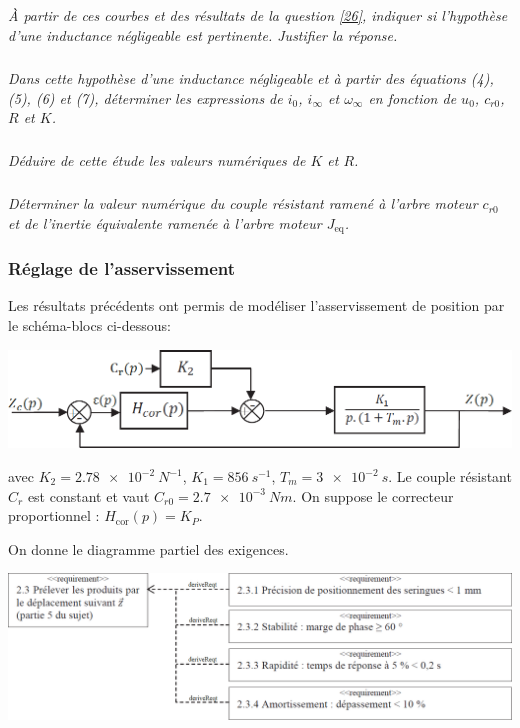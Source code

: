 \documentclass[10pt,fleqn]{article} %
\begin{document}
\subparagraph{}\textit{À partir de ces courbes et des résultats de la question \ref{26}, indiquer si l’hypothèse d’une inductance négligeable est pertinente. Justifier la réponse.}

\subparagraph{}\textit{Dans cette hypothèse d’une inductance négligeable et à partir des équations (4), (5), (6) et (7), déterminer les expressions de $i_0$, $i_{\infty}$ et $\omega_{\infty}$ en fonction de $u_0$, $c_{r0}$, $R$ et $K$.}

\subparagraph{}\textit{Déduire de cette étude les valeurs numériques de $K$ et $R$.}

\subparagraph{}\textit{Déterminer la valeur numérique du couple résistant ramené à l’arbre moteur $c_{r0}$ et de l’inertie équivalente ramenée à l’arbre moteur $J_{\text{eq}}$.}


\subsubsection{Réglage de l’asservissement}
Les résultats précédents ont permis de modéliser l’asservissement de position par le schéma-blocs ci-dessous:

\begin{center}
\includegraphics[width=.8\linewidth]{images/ccp_11}
\end{center}

avec $K_2 = \SI{2,78e-2}{N^{-1}}$, $K_1  = \SI{856}{s^{-1}}$, $T_m=\SI{3e-2}{s}$. Le couple résistant $C_r$ est constant et vaut $C_{r0} = \SI{2,7e-3}{Nm}$.
On suppose le correcteur proportionnel : $H_{\text{cor}}(p)=K_P$.

On donne le diagramme partiel des exigences.

\begin{center}
\includegraphics[width=.8\linewidth]{images/ccp_14}
\end{center}
\end{document}
